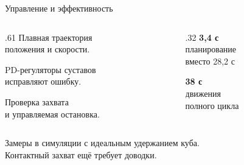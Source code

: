 \documentclass[aspectratio=169,12pt]{beamer}
\newcommand{\bodyfont}{\fontsize{15}{19}\selectfont}
\begin{document}
\begin{frame}[t]{Управление и эффективность}
\vspace{3mm}
\begin{columns}[T,onlytextwidth]
\begin{column}{.61\textwidth}
\bodyfont
Плавная траектория\\положения и скорости.

\vspace{3mm}
PD-регуляторы суставов\\исправляют ошибку.

\vspace{3mm}
Проверка захвата\\и управляемая остановка.
\end{column}
\begin{column}{.32\textwidth}
{\fontsize{28}{30}\selectfont\bfseries\color{accent}3,4 с}\\[2mm]
{\fontsize{13}{16}\selectfont планирование\\вместо 28,2 с}

\vspace{4mm}
{\fontsize{28}{30}\selectfont\bfseries\color{accent}38 с}\\[2mm]
{\fontsize{13}{16}\selectfont движения\\полного цикла}
\end{column}
\end{columns}
\vspace{2mm}
{\fontsize{11}{14}\selectfont\color{muted}Замеры в симуляции с идеальным удержанием куба.\\Контактный захват ещё требует доводки.}
\end{frame}
\end{document}
